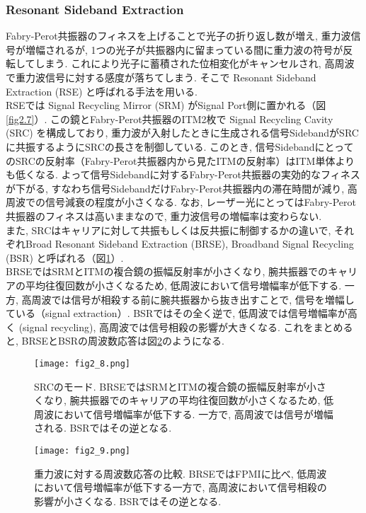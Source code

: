\subsubsection{Resonant Sideband Extraction}
\vskip3mm
Fabry-Perot共振器のフィネスを上げることで光子の折り返し数が増え, 重力波信号が増幅されるが, 1つの光子が共振器内に留まっている間に重力波の符号が反転してしまう. これにより光子に蓄積された位相変化がキャンセルされ, 高周波で重力波信号に対する感度が落ちてしまう. そこで Resonant Sideband Extraction (RSE) と呼ばれる手法を用いる\cite{RSE}. \\
\quad RSEでは Signal Recycling Mirror (SRM) がSignal Port側に置かれる（図\ref{fig2.7}）. この鏡とFabry-Perot共振器のITM2枚で Signal Recycling Cavity (SRC) を構成しており, 重力波が入射したときに生成される信号SidebandがSRCに共振するようにSRCの長さを制御している. このとき, 信号SidebandにとってのSRCの反射率（Fabry-Perot共振器内から見たITMの反射率）はITM単体よりも低くなる. よって信号Sidebandに対するFabry-Perot共振器の実効的なフィネスが下がる, すなわち信号SidebandだけFabry-Perot共振器内の滞在時間が減り, 高周波での信号減衰の程度が小さくなる. なお, レーザー光にとってはFabry-Perot共振器のフィネスは高いままなので, 重力波信号の増幅率は変わらない. \\
\quad また, SRCはキャリアに対して共振もしくは反共振に制御するかの違いで, それぞれBroad Resonant Sideband Extraction (BRSE), Broadband Signal Recycling (BSR) と呼ばれる（図\ref{fig2.8}）. \\
\quad BRSEではSRMとITMの複合鏡の振幅反射率が小さくなり, 腕共振器でのキャリアの平均往復回数が小さくなるため, 低周波において信号増幅率が低下する. 一方, 高周波では信号が相殺する前に腕共振器から抜き出すことで, 信号を増幅している（signal extraction）. BSRではその全く逆で, 低周波では信号増幅率が高く (signal recycling), 高周波では信号相殺の影響が大きくなる. これをまとめると, BRSEとBSRの周波数応答は図\ref{fig2.9}のようになる. 
\begin{figure}[H]
\begin{center}
\texttt{[image: fig2\_8.png]}
\caption[SRCのモード]{SRCのモード. BRSEではSRMとITMの複合鏡の振幅反射率が小さくなり, 腕共振器でのキャリアの平均往復回数が小さくなるため, 低周波において信号増幅率が低下する. 一方で, 高周波では信号が増幅される. BSRではその逆となる. }
\label{fig2.8}
\end{center}
\end{figure}
\begin{figure}[H]
\begin{center}
\texttt{[image: fig2\_9.png]}
\caption[光の散射雑音スペクトルの概念図]{重力波に対する周波数応答の比較. BRSEではFPMIに比べ, 低周波において信号増幅率が低下する一方で, 高周波において信号相殺の影響が小さくなる. BSRではその逆となる. }
\label{fig2.9}
\end{center}
\end{figure}
